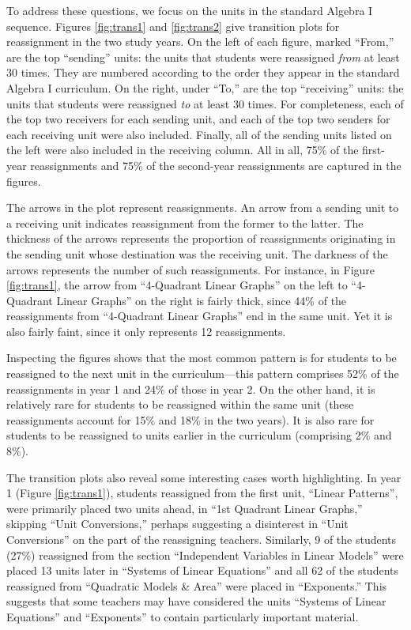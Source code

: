 \documentclass[12pt]{article}\usepackage[]{graphicx}\usepackage[]{color}
\begin{document}
To address these questions, we focus on the units in the standard
Algebra I sequence.
Figures \ref{fig:trans1} and \ref{fig:trans2} give transition plots
for reassignment in the two study years.
On the left of each figure, marked ``From,'' are the top ``sending''
units: the units that students were reassigned \emph{from} at least 30
times.
They are numbered according to the order they appear in the standard Algebra I curriculum.
On the right, under ``To,'' are the top ``receiving'' units: the units
that students were reassigned \emph{to} at least 30 times.
For completeness, each of the top two receivers for each sending unit,
and each of the top two senders for each receiving unit were also included.
Finally, all of the sending units listed on the left were also included in the
receiving column.
All in all, 75\% of the first-year reassignments and
75\% of the second-year reassignments are
captured in the figures.

The arrows in the plot represent reassignments.
An arrow from a sending unit to a receiving unit indicates
reassignment from the former to the latter.
The thickness of the arrows represents the proportion of reassignments
originating in the sending unit whose destination was the receiving unit.
The darkness of the arrows represents the number of such reassignments.
For instance, in Figure \ref{fig:trans1}, the arrow from
``4-Quadrant Linear Graphs'' on the left to ``4-Quadrant Linear
Graphs'' on the right is fairly thick, since
44\%
of the reassignments from ``4-Quadrant Linear Graphs'' end in the
same unit.
Yet it is also fairly faint, since it only represents
12
reassignments.

Inspecting the figures shows that the most common pattern is for
students to be reassigned to the next unit in the curriculum---this pattern comprises
52\% of the reassignments in year 1 and
24\% of those in
year 2.
On the other hand, it is relatively rare for students to be reassigned within the same unit
(these reassignments account for 15\% and 18\% in the two years).
It is also rare for students to be reassigned to units earlier in the curriculum (comprising
2\% and
8\%).

The transition plots also reveal some interesting cases worth highlighting.
In year 1 (Figure \ref{fig:trans1}), students reassigned from the first unit, ``Linear Patterns'', were primarily placed two units ahead, in ``1st Quadrant Linear Graphs,'' skipping ``Unit Conversions,'' perhaps suggesting a disinterest in ``Unit Conversions'' on the part of the reassigning teachers.
Similarly,
9
of the students
(27\%)
reassigned from the section ``Independent Variables in Linear Models'' were placed 13 units later in ``Systems of Linear Equations''
and all 62 of the students reassigned from ``Quadratic Models \& Area'' were placed in ``Exponents.''
This suggests that some teachers may have considered the units ``Systems of Linear Equations'' and ``Exponents'' to contain particularly important material.
\end{document}

